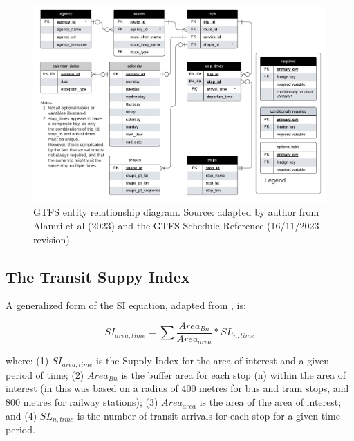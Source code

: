 \documentclass[preprint, 3p,
authoryear]{elsarticle} %
\begin{document}
\begin{figure}
\includegraphics[width=1\linewidth]{graphics/GTFS} \caption{GTFS entity relationship diagram. Source: adapted by author from Alamri et al (2023) and the GTFS Schedule Reference (16/11/2023 revision).}\label{fig:GTFS_ERD}
\end{figure}

\hypertarget{the-transit-suppy-index}{%
\subsection{The Transit Suppy Index}\label{the-transit-suppy-index}}

A generalized form of the SI equation, adapted from
\citet{currie2010identifying}, is:

\[SI_{area, time} = \sum{\frac{Area_{Bn}}{Area_{area}}*SL_{n, time}}\]

where: (1) \(SI_{area, time}\) is the Supply Index for the area of
interest and a given period of time; (2) \(Area_{Bn}\) is the buffer
area for each stop (n) within the area of interest (in
\citet{currie2010identifying} this was based on a radius of 400 metres
for bus and tram stops, and 800 metres for railway stations); (3)
\(Area_{area}\) is the area of the area of interest; and (4)
\(SL_{n,time}\) is the number of transit arrivals for each stop for a
given time period.
\end{document}
